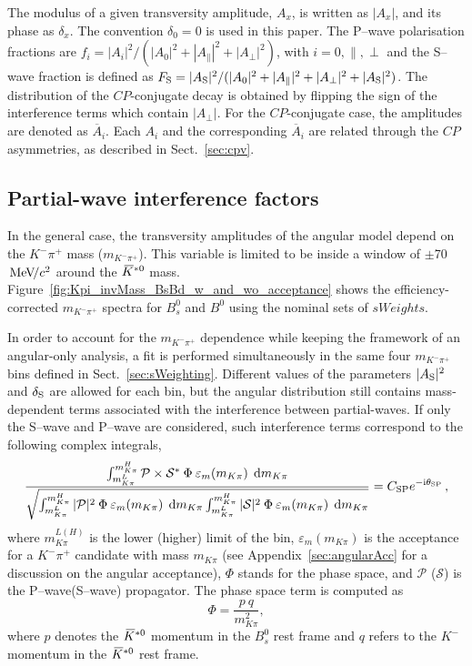 \documentclass[12pt,a4paper]{article}
\newcommand{\CP}{\ensuremath{{C\!P}}\xspace}
\newcommand{\sweights} {\mbox{$sW\!eights$}\xspace}
\def\CP                {\ensuremath{C\!P}\xspace}
\newcommand{\mkpi}{\ensuremath{m_{\Km\pip}}\xspace}
\newcommand{\Bs}{\ensuremath{B^0_s}\xspace}
\newcommand{\Bd}{\ensuremath{B^0}\xspace}
\def\Kbar  {\kern 0.2em\overline{\kern -0.2em K}{}\xspace}
\def\Kstarzb {\ensuremath{\Kbar^{*0}}\xspace}
\newcommand{\mevcc}{\ensuremath{{\mathrm{\,Me\kern -0.1em V\!/}c^2}}\xspace}
\newcommand{\MeVcc}{\mevcc}
\newcommand{\Km}{\ensuremath{K^-}\xspace}
\newcommand{\pip}{\ensuremath{\pi^+}\xspace}
\newcommand{\swave}{{\rm S--wave}\xspace}
\newcommand{\pwave}{{\rm P--wave}\xspace}
\newcommand{\appref}[1]{Appendix~\ref{#1}}
\newcommand{\secref}[1]{Sect.~\ref{#1}}
\begin{document}
The modulus of a given transversity amplitude, $A_x$, is written as $|A_x|$, and its phase as $\delta_x$. 
The convention $\delta_0 = 0$ is used in this paper.
The \pwave polarisation fractions are $f_i = |A_i|^2 / ( |A_0|^2 + |A_\parallel|^2 + |A_\perp|^2 )$, with $i=0, \parallel, \perp$ and 
the \swave fraction is defined as $F_{\rm S} = |A_{\rm S}|^2 / ( |A_0|^2 + |A_\parallel|^2 + |A_\perp|^2 + |A_{\rm S}|^2)$. 
The distribution of the \CP-conjugate decay is obtained by flipping the sign of the interference terms
which contain $|A_{\perp}|$. 
For the \CP-conjugate case, the amplitudes are denoted as $\overline{A}_i$. Each $A_i$ and the corresponding $\overline{A}_i$ are related
through the \CP asymmetries, as described in \secref{sec:cpv}.

\subsection{Partial-wave interference factors}
\label{sec:CSP}

In the general case, the transversity amplitudes of the angular model depend on the $\Km\pip$ mass (\mkpi). This variable is limited to be inside a window of $\pm$70\MeVcc around the \Kstarzb mass. 
Figure~\ref{fig:Kpi_invMass_BsBd_w_and_wo_acceptance} shows the efficiency-corrected \mkpi spectra for \Bs and \Bd using the nominal sets of \sweights.

In order to account for the \mkpi dependence while keeping the framework of an angular-only
analysis, a fit is performed simultaneously in the same four \mkpi bins defined in \secref{sec:sWeighting}.
Different values of the parameters $|A_{\rm S}|^{2}$ and $\delta_{\rm S}$ are allowed for
each bin, but the angular distribution still contains mass-dependent terms associated with the interference between partial-waves.
If only the \swave and \pwave are considered, such interference terms correspond
to the following complex integrals,
\begin{equation}
\label{eq:CSP}
\frac{\int_{m_{K\pi}^L}^{m_{K\pi}^H} { \mathcal{P} \times \mathcal{S}^*\:{\Phi}\:\varepsilon_{m}(m_{K\pi})}  \:\:\text{d}
m_{K\pi}}
{\sqrt{\int_{m_{K\pi}^L}^{m_{K\pi}^H} { |\mathcal{P}|^2\:{\Phi}\:\varepsilon_{m}(m_{K\pi})}  \:\:\text{d}
m_{K\pi} \int_{m_{K\pi}^L}^{m_{K\pi}^H} { |\mathcal{S}|^2\:{\Phi}\:\varepsilon_{m}(m_{K\pi})}  \:\:\text{d}
m_{K\pi}}}
 = C_{\rm SP} e^{-\text{i} \theta_{\rm SP}} \,,
\end{equation}
where $m_{K\pi}^{L(H)}$ is the lower (higher) limit of the bin, $\varepsilon_{m}(m_{K\pi})$ is the acceptance for a $\Km\pip$ candidate with mass $m_{K\pi}$ (see \appref{sec:angularAcc} for a discussion on the angular acceptance), $\Phi$ stands for the phase space, and $\mathcal{P}$ ($\mathcal{S}$) is the \pwave (\swave) propagator. The phase space term is computed as
\begin{equation}
\Phi=\frac{p\:q}{m_{K\pi}^{2}},
\end{equation}
where $p$ denotes the $\Kstarzb$ momentum in the $B_{s}^{0}$ rest frame and $q$ refers to the $K^{-}$ momentum in the $\Kstarzb$ rest frame.
\end{document}
